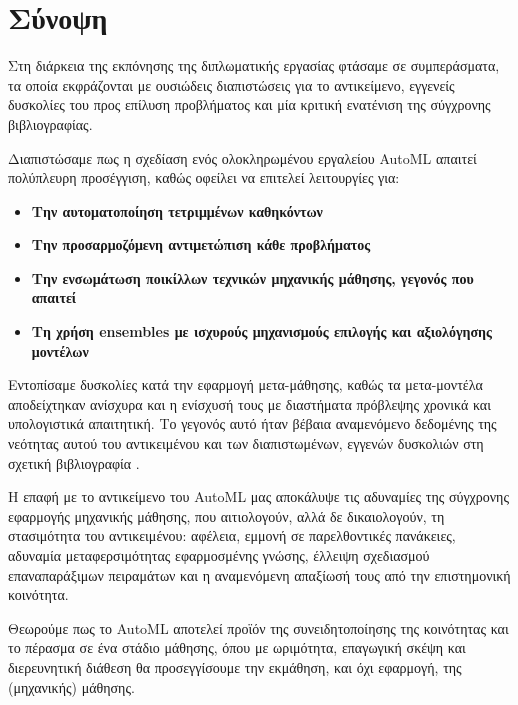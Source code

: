 \chapter{Σύνοψη}
Στη διάρκεια της εκπόνησης της διπλωματικής εργασίας φτάσαμε σε συμπεράσματα, τα οποία εκφράζονται με ουσιώδεις διαπιστώσεις για το αντικείμενο, εγγενείς δυσκολίες του προς επίλυση προβλήματος και μία κριτική ενατένιση της σύγχρονης βιβλιογραφίας.

Διαπιστώσαμε πως η σχεδίαση ενός ολοκληρωμένου εργαλείου \gls{AutoML} απαιτεί πολύπλευρη προσέγγιση, καθώς οφείλει να επιτελεί λειτουργίες για:
\begin{itemize}
	\item \textbf{Την αυτοματοποίηση τετριμμένων καθηκόντων}
	\item \textbf{Την προσαρμοζόμενη αντιμετώπιση κάθε προβλήματος}
	\item \textbf{Την ενσωμάτωση ποικίλλων τεχνικών μηχανικής μάθησης, γεγονός που απαιτεί}
	\item \textbf{Τη χρήση ensembles με ισχυρούς μηχανισμούς επιλογής και αξιολόγησης μοντέλων}
\end{itemize}

Εντοπίσαμε δυσκολίες κατά την εφαρμογή μετα-μάθησης, καθώς τα μετα-μοντέλα αποδείχτηκαν ανίσχυρα και η ενίσχυσή τους με διαστήματα πρόβλεψης χρονικά και υπολογιστικά απαιτητική. Το γεγονός αυτό ήταν βέβαια αναμενόμενο δεδομένης της νεότητας αυτού του αντικειμένου και των διαπιστωμένων, εγγενών δυσκολιών στη σχετική βιβλιογραφία \citep{Feurer:2014:UMI:3015544.3015549, kuba2002exploiting, Soares2004}.

Η επαφή με το αντικείμενο του \gls{AutoML} μας αποκάλυψε τις αδυναμίες της σύγχρονης εφαρμογής μηχανικής μάθησης, που αιτιολογούν, αλλά δε δικαιολογούν, τη στασιμότητα του αντικειμένου: αφέλεια, εμμονή σε παρελθοντικές πανάκειες, αδυναμία μεταφερσιμότητας εφαρμοσμένης γνώσης, έλλειψη σχεδιασμού επαναπαράξιμων πειραμάτων και η αναμενόμενη απαξίωσή τους από την επιστημονική κοινότητα.

Θεωρούμε πως το \gls{AutoML} αποτελεί προϊόν της συνειδητοποίησης της κοινότητας και το πέρασμα σε ένα στάδιο μάθησης, όπου με ωριμότητα, επαγωγική σκέψη και διερευνητική διάθεση θα προσεγγίσουμε την εκμάθηση, και όχι εφαρμογή, της (μηχανικής) μάθησης.